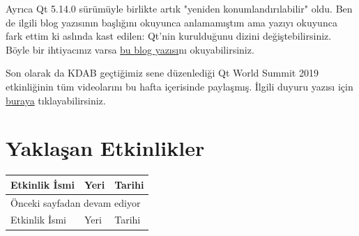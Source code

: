 \documentclass[11pt]{article}
\begin{document}
Ayrıca Qt 5.14.0 sürümüyle birlikte artık "yeniden konumlandırılabilir" oldu.
Ben de ilgili blog yazısının başlığını okuyunca anlamamıştım ama yazıyı
okuyunca fark ettim ki aslında kast edilen: Qt'nin kurulduğunu dizini
değiştebilirsiniz. Böyle bir ihtiyacınız varsa \href{https://www.qt.io/blog/qt-is-relocatable}{bu blog yazısı}nı
okuyabilirsiniz.

Son olarak da KDAB geçtiğimiz sene düzenlediği Qt World Summit 2019
etkinliğinin tüm videolarını bu hafta içerisinde paylaşmış. İlgili duyuru
yazısı için \href{https://www.kdab.com/qt-world-summit-2019-talk-videos-are-online/}{buraya} tıklayabilirsiniz.
\section{Yaklaşan Etkinlikler}
\label{sec:org9165b97}
\begin{longtable}{|p{8cm}|l|l|}
\hline
Etkinlik İsmi & Yeri & Tarihi\\
\hline
\endfirsthead
\multicolumn{3}{l}{Önceki sayfadan devam ediyor} \\
\hline

Etkinlik İsmi & Yeri & Tarihi \\


\end{longtable}
\end{document}
